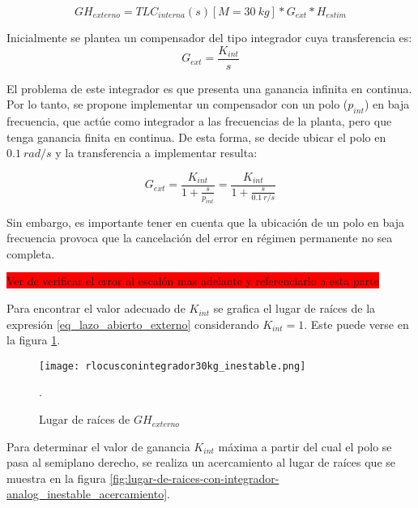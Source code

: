 \begin{equation} \label{eq_lazo_abierto_externo}
	GH_{externo}=TLC_{interna}(s)[M=30\:kg]*G_{ext}*H_{estim}
\end{equation}

Inicialmente se plantea un compensador del tipo integrador cuya transferencia es:
\begin{equation}
	G_{ext}= \frac{K_{int}}{s}
\end{equation}

El problema de este integrador es que presenta una ganancia infinita en continua. Por lo tanto, se propone implementar un compensador con un polo ($p_{int}$) en baja frecuencia, que actúe como integrador a las frecuencias de la planta, pero que tenga ganancia finita en continua. De esta forma, se decide ubicar el polo en $0.1\:rad/s$ y la transferencia a implementar resulta:

\begin{equation}
	G_{ext}=\frac{K_{int}}{1+\frac{s}{p_{int}}}=\frac{K_{int}}{1+\frac{s}{0.1\:r/s}}	
\end{equation}

Sin embargo, es importante tener en cuenta que la ubicación de un polo en baja frecuencia provoca que la cancelación del error en régimen permanente no sea completa.

\colorbox{red}{Ver de verificar el error al escalón mas adelante y referenciarlo a esta parte}

Para encontrar el valor adecuado de $K_{int}$ se grafica el lugar de raíces de la expresión \ref{eq_lazo_abierto_externo} considerando $K_{int}=1$. Este puede verse en la figura \ref{fig:lugar-de-raices-con-integrador-analog_inestable}.

\begin{figure}[H]
	\centering
	\texttt{[image: rlocusconintegrador30kg\_inestable.png]}
	\caption{Lugar de raíces de $GH_{externo}$}.
	\label{fig:lugar-de-raices-con-integrador-analog_inestable}
\end{figure}

Para determinar el valor de ganancia $K_{int}$ máxima a partir del cual el polo se pasa al semiplano derecho, se realiza un acercamiento al lugar de raíces que se muestra en la figura \ref{fig:lugar-de-raices-con-integrador-analog_inestable_acercamiento}. 

